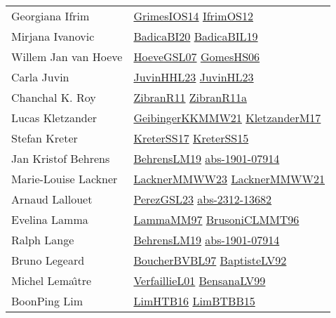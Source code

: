 {\begin{longtable}{p{4cm}p{20cm}}
Georgiana Ifrim & \href{articles/GrimesIOS14.pdf}{GrimesIOS14}\cite{GrimesIOS14} \href{papers/IfrimOS12.pdf}{IfrimOS12}\cite{IfrimOS12} \\
Mirjana Ivanovic & \href{}{BadicaBI20}\cite{BadicaBI20} \href{papers/BadicaBIL19.pdf}{BadicaBIL19}\cite{BadicaBIL19} \\
Willem Jan van Hoeve & \href{papers/HoeveGSL07.pdf}{HoeveGSL07}\cite{HoeveGSL07} \href{papers/GomesHS06.pdf}{GomesHS06}\cite{GomesHS06} \\
Carla Juvin & \href{papers/JuvinHHL23.pdf}{JuvinHHL23}\cite{JuvinHHL23} \href{papers/JuvinHL23.pdf}{JuvinHL23}\cite{JuvinHL23} \\
Chanchal K. Roy & \href{papers/ZibranR11.pdf}{ZibranR11}\cite{ZibranR11} \href{papers/ZibranR11a.pdf}{ZibranR11a}\cite{ZibranR11a} \\
Lucas Kletzander & \href{papers/GeibingerKKMMW21.pdf}{GeibingerKKMMW21}\cite{GeibingerKKMMW21} \href{papers/KletzanderM17.pdf}{KletzanderM17}\cite{KletzanderM17} \\
Stefan Kreter & \href{articles/KreterSS17.pdf}{KreterSS17}\cite{KreterSS17} \href{papers/KreterSS15.pdf}{KreterSS15}\cite{KreterSS15} \\
Jan Kristof Behrens & \href{papers/BehrensLM19.pdf}{BehrensLM19}\cite{BehrensLM19} \href{articles/abs-1901-07914.pdf}{abs-1901-07914}\cite{abs-1901-07914} \\
Marie{-}Louise Lackner & \href{articles/LacknerMMWW23.pdf}{LacknerMMWW23}\cite{LacknerMMWW23} \href{papers/LacknerMMWW21.pdf}{LacknerMMWW21}\cite{LacknerMMWW21} \\
Arnaud Lallouet & \href{papers/PerezGSL23.pdf}{PerezGSL23}\cite{PerezGSL23} \href{articles/abs-2312-13682.pdf}{abs-2312-13682}\cite{abs-2312-13682} \\
Evelina Lamma & \href{articles/LammaMM97.pdf}{LammaMM97}\cite{LammaMM97} \href{papers/BrusoniCLMMT96.pdf}{BrusoniCLMMT96}\cite{BrusoniCLMMT96} \\
Ralph Lange & \href{papers/BehrensLM19.pdf}{BehrensLM19}\cite{BehrensLM19} \href{articles/abs-1901-07914.pdf}{abs-1901-07914}\cite{abs-1901-07914} \\
Bruno Legeard & \href{}{BoucherBVBL97}\cite{BoucherBVBL97} \href{papers/BaptisteLV92.pdf}{BaptisteLV92}\cite{BaptisteLV92} \\
Michel Lema{\^{\i}}tre & \href{papers/VerfaillieL01.pdf}{VerfaillieL01}\cite{VerfaillieL01} \href{articles/BensanaLV99.pdf}{BensanaLV99}\cite{BensanaLV99} \\
BoonPing Lim & \href{papers/LimHTB16.pdf}{LimHTB16}\cite{LimHTB16} \href{papers/LimBTBB15.pdf}{LimBTBB15}\cite{LimBTBB15} \\

\end{longtable}}
